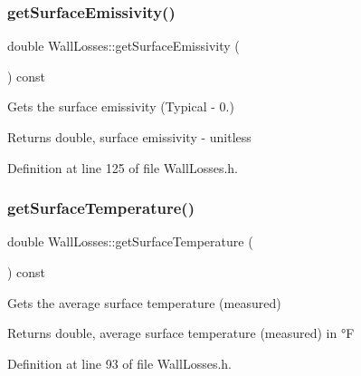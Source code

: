 \mbox{\label{class_wall_losses_ae1fce9523d14831ef6bc9b7823d5ea08}} 
\subsubsection{\texorpdfstring{get\+Surface\+Emissivity()}{getSurfaceEmissivity()}}
{\footnotesize\ttfamily double Wall\+Losses\+::get\+Surface\+Emissivity (\begin{DoxyParamCaption}{ }\end{DoxyParamCaption}) const\hspace{0.3cm}{\ttfamily [inline]}}

Gets the surface emissivity (Typical -\/ 0.) \begin{DoxyReturn}{Returns}
double, surface emissivity -\/ unitless 
\end{DoxyReturn}


Definition at line 125 of file Wall\+Losses.\+h.

\mbox{\label{class_wall_losses_ac2ce3cea6eef435a5fcf6a659b8e7d70}} 
\subsubsection{\texorpdfstring{get\+Surface\+Temperature()}{getSurfaceTemperature()}}
{\footnotesize\ttfamily double Wall\+Losses\+::get\+Surface\+Temperature (\begin{DoxyParamCaption}{ }\end{DoxyParamCaption}) const\hspace{0.3cm}{\ttfamily [inline]}}

Gets the average surface temperature (measured) \begin{DoxyReturn}{Returns}
double, average surface temperature (measured) in °F 
\end{DoxyReturn}


Definition at line 93 of file Wall\+Losses.\+h.

\mbox{\label{class_wall_losses_ae68657cacdfbaf8cdc48324dd580cf3b}} 
